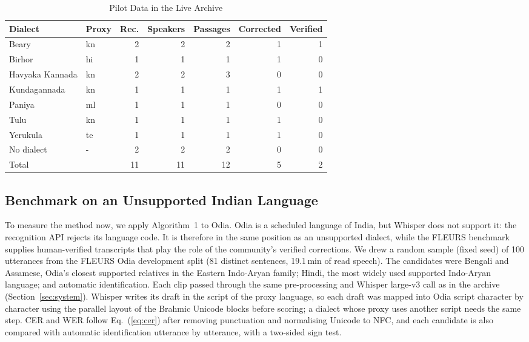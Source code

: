 \documentclass[conference]{IEEEtran}
\begin{document}
\begin{table}[t]
\caption{Pilot Data in the Live Archive}
\label{tab:pilot}
\centering
\setlength{\tabcolsep}{3pt}
\begin{tabular}{llrrrrr}
\toprule
Dialect & Proxy & Rec. & Speakers & Passages & Corrected & Verified \\
\midrule
Beary & kn & 2 & 2 & 2 & 1 & 1 \\
Birhor & hi & 1 & 1 & 1 & 1 & 0 \\
Havyaka Kannada & kn & 2 & 2 & 3 & 0 & 0 \\
Kundagannada & kn & 1 & 1 & 1 & 1 & 1 \\
Paniya & ml & 1 & 1 & 1 & 0 & 0 \\
Tulu & kn & 1 & 1 & 1 & 1 & 0 \\
Yerukula & te & 1 & 1 & 1 & 1 & 0 \\
No dialect & - & 2 & 2 & 2 & 0 & 0 \\
\midrule
Total & & 11 & 11 & 12 & 5 & 2 \\
\bottomrule
\end{tabular}
\end{table}

\subsection{Benchmark on an Unsupported Indian Language}
To measure the method now, we apply Algorithm~1 to Odia. Odia is a scheduled language of India, but Whisper does not support it: the recognition API rejects its language code. It is therefore in the same position as an unsupported dialect, while the FLEURS benchmark \cite{conneau2023} supplies human-verified transcripts that play the role of the community's verified corrections. We drew a random sample (fixed seed) of 100 utterances from the FLEURS Odia development split (81 distinct sentences, 19.1\,min of read speech). The candidates were Bengali and Assamese, Odia's closest supported relatives in the Eastern Indo-Aryan family; Hindi, the most widely used supported Indo-Aryan language; and automatic identification. Each clip passed through the same pre-processing and Whisper large-v3 call as in the archive (Section~\ref{sec:system}). Whisper writes its draft in the script of the proxy language, so each draft was mapped into Odia script character by character using the parallel layout of the Brahmic Unicode blocks before scoring; a dialect whose proxy uses another script needs the same step. CER and WER follow Eq.~(\ref{eq:cer}) after removing punctuation and normalising Unicode to NFC, and each candidate is also compared with automatic identification utterance by utterance, with a two-sided sign test.
\end{document}
